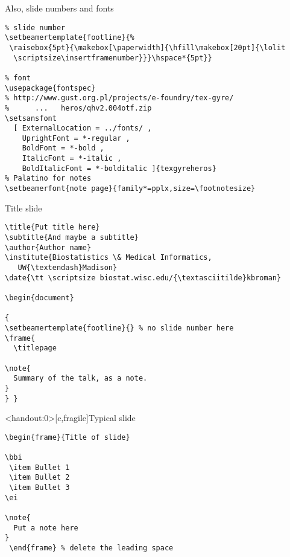 \documentclass[12pt,t]{beamer}
\begin{document}
\begin{frame}[c,fragile]{Also, slide numbers and fonts}

\begin{lstlisting}
% slide number
\setbeamertemplate{footline}{%
 \raisebox{5pt}{\makebox[\paperwidth]{\hfill\makebox[20pt]{\lolit
  \scriptsize\insertframenumber}}}\hspace*{5pt}}

% font
\usepackage{fontspec}
% http://www.gust.org.pl/projects/e-foundry/tex-gyre/
%      ...   heros/qhv2.004otf.zip
\setsansfont
  [ ExternalLocation = ../fonts/ ,
    UprightFont = *-regular ,
    BoldFont = *-bold ,
    ItalicFont = *-italic ,
    BoldItalicFont = *-bolditalic ]{texgyreheros}
% Palatino for notes
\setbeamerfont{note page}{family*=pplx,size=\footnotesize}
\end{lstlisting}

\end{frame}



\begin{frame}[c,fragile]{Title slide}

\begin{lstlisting}
\title{Put title here}
\subtitle{And maybe a subtitle}
\author{Author name}
\institute{Biostatistics \& Medical Informatics,
   UW{\textendash}Madison}
\date{\tt \scriptsize biostat.wisc.edu/{\textasciitilde}kbroman}

\begin{document}

{
\setbeamertemplate{footline}{} % no slide number here
\frame{
  \titlepage

\note{
  Summary of the talk, as a note.
}
} }
\end{lstlisting}

\end{frame}


\begin{frame}<handout:0>[c,fragile]{Typical slide}

\begin{lstlisting}
\begin{frame}{Title of slide}

\bbi
 \item Bullet 1
 \item Bullet 2
 \item Bullet 3
\ei

\note{
  Put a note here
}
 \end{frame} % delete the leading space
\end{lstlisting}

\end{frame}
\end{document}
